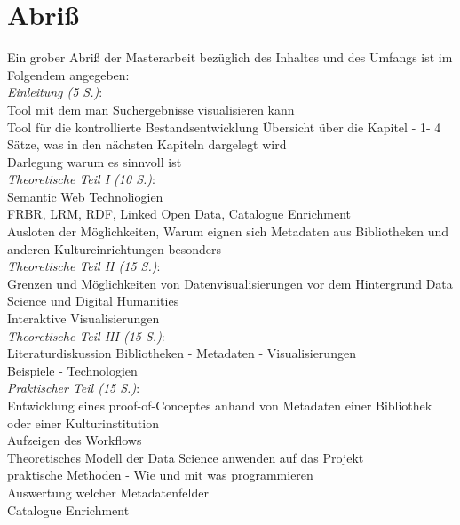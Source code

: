 \documentclass[10pt,a4paper,twocolumn,conference]{IEEEtran}
\begin{document}
\section{Abriß}
Ein grober Abriß der Masterarbeit bezüglich des Inhaltes und des Umfangs ist im
Folgendem angegeben:\\
\textit{Einleitung (5 S.)}:\\ Tool mit dem man Suchergebnisse visualisieren kann\\
Tool für die kontrollierte Bestandsentwicklung Übersicht über die Kapitel - 1- 4 Sätze, was in den nächsten Kapiteln dargelegt wird\\
Darlegung warum es sinnvoll ist\\
\textit{Theoretische Teil I (10 S.)}:\\
Semantic Web Technoliogien\\
FRBR, LRM, RDF, Linked Open Data, Catalogue Enrichment\\
Ausloten der Möglichkeiten, Warum eignen sich Metadaten aus Bibliotheken und anderen Kultureinrichtungen besonders\\
\textit{Theoretische Teil II (15 S.)}:\\
Grenzen und Möglichkeiten von Datenvisualisierungen vor dem
Hintergrund Data Science und Digital Humanities\\
Interaktive Visualisierungen\\ 
\textit{Theoretische Teil III (15 S.)}:\\
Literaturdiskussion Bibliotheken - Metadaten - Visualisierungen\\
Beispiele - Technologien\\
\textit{Praktischer Teil (15 S.)}:\\
Entwicklung eines proof-of-Conceptes anhand von Metadaten einer
Bibliothek oder einer Kulturinstitution\\
Aufzeigen des Workflows\\
Theoretisches Modell der Data Science anwenden auf das Projekt\\
praktische Methoden - Wie und mit was programmieren\\
Auswertung welcher Metadatenfelder\\
Catalogue Enrichment

            
            

 
\end{document}
